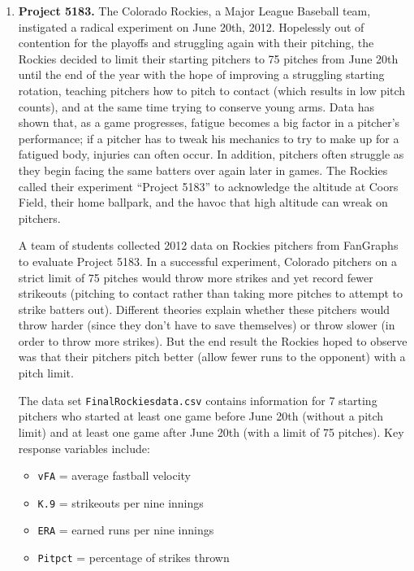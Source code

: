 \documentclass[
]{krantz}
\providecommand{\tightlist}{%
  \setlength{\itemsep}{0pt}\setlength{\parskip}{0pt}}
\begin{document}
\begin{enumerate}
\def\labelenumi{\arabic{enumi}.}
\setcounter{enumi}{2}
\item
  \textbf{Project 5183.} The Colorado Rockies, a Major League Baseball team, instigated a radical experiment on June 20th, 2012. Hopelessly out of contention for the playoffs and struggling again with their pitching, the Rockies decided to limit their starting pitchers to 75 pitches from June 20th until the end of the year with the hope of improving a struggling starting rotation, teaching pitchers how to pitch to contact (which results in low pitch counts), and at the same time trying to conserve young arms. Data has shown that, as a game progresses, fatigue becomes a big factor in a pitcher's performance; if a pitcher has to tweak his mechanics to try to make up for a fatigued body, injuries can often occur. In addition, pitchers often struggle as they begin facing the same batters over again later in games. The Rockies called their experiment ``Project 5183'' to acknowledge the altitude at Coors Field, their home ballpark, and the havoc that high altitude can wreak on pitchers.

  A team of students collected 2012 data on Rockies pitchers from FanGraphs to evaluate Project 5183. \citep{Strutz2013} In a successful experiment, Colorado pitchers on a strict limit of 75 pitches would throw more strikes and yet record fewer strikeouts (pitching to contact rather than taking more pitches to attempt to strike batters out). Different theories explain whether these pitchers would throw harder (since they don't have to save themselves) or throw slower (in order to throw more strikes). But the end result the Rockies hoped to observe was that their pitchers pitch better (allow fewer runs to the opponent) with a pitch limit.

  The data set \texttt{FinalRockiesdata.csv} contains information for 7 starting pitchers who started at least one game before June 20th (without a pitch limit) and at least one game after June 20th (with a limit of 75 pitches). Key response variables include:

  \begin{itemize}
  \tightlist
  \item
    \texttt{vFA} = average fastball velocity
  \item
    \texttt{K.9} = strikeouts per nine innings
  \item
    \texttt{ERA} = earned runs per nine innings
  \item
    \texttt{Pitpct} = percentage of strikes thrown
  \end{itemize}


\end{enumerate}
\end{document}
